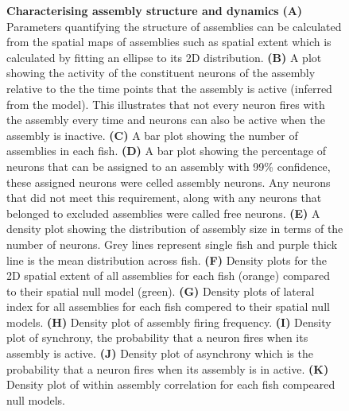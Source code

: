 \begin{figure}[!ht]
            \caption[\label{fig:R1_F5} \textbf{Characterising assembly structure and dynamics}]{\label{fig:R1_F5} \textbf{Characterising assembly structure and dynamics} \textbf{(A)} Parameters quantifying the structure of assemblies can be calculated from the spatial maps of assemblies such as spatial extent which is calculated by fitting an ellipse to its 2D distribution. \textbf{(B)} A plot showing the activity of the constituent neurons of the assembly relative to the the time points that the assembly is active (inferred from the model). This illustrates that not every neuron fires with the assembly every time and neurons can also be active when the assembly is inactive. \textbf{(C)} A bar plot showing the number of assemblies in each fish.  \textbf{(D)} A bar plot showing the percentage of neurons that can be assigned to an assembly with 99\% confidence, these assigned neurons were celled assembly neurons. Any neurons that did not meet this requirement, along with any neurons that belonged to excluded assemblies were called free neurons. \textbf{(E)} A density plot showing the distribution of assembly size in terms of the number of neurons. Grey lines represent single fish and purple thick line is the mean distribution across fish. \textbf{(F)} Density plots for the 2D spatial extent of all assemblies for each fish (orange) compared to their spatial null model (green). \textbf{(G)} Density plots of lateral index for all assemblies for each fish compered to their spatial null models. \textbf{(H)} Density plot of assembly firing frequency. \textbf{(I)} Density plot of synchrony, the probability that a neuron fires when its assembly is active. \textbf{(J)} Density plot of asynchrony which is the probability that a neuron fires when its assembly is in active. \textbf{(K)} Density plot of within assembly correlation for each fish compeared null models.}
      \end{figure}


